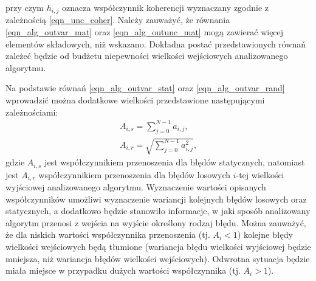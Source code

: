 przy czym $h_{i,j}$ oznacza współczynnik koherencji wyznaczany zgodnie z zależnością \eqref{eqn_unc_coher}. Należy zauważyć, że równania \eqref{eqn_alg_outvar_mat} oraz \eqref{eqn_alg_outunc_mat} mogą zawierać więcej elementów składowych, niż wskazano. Dokładna postać przedstawionych równań zależeć będzie od budżetu niepewności wielkości wejściowych analizowanego algorytmu.

Na podstawie równań \eqref{eqn_alg_outvar_stat} oraz \eqref{eqn_alg_outvar_rand} wprowadzić można dodatkowe wielkości przedstawione następującymi zależnościami:
\begin{gather}
A_{i,s} = \sum _{j = 0} ^{N-1} a_{i, j} \label{eqn_alg_trans_stat}, \\
A_{i,r} = \sqrt{\sum _{j = 0} ^{N-1} a_{i, j}^{2}} \label{eqn_alg_trans_rand},
\end{gather}
gdzie $A_{i,s}$ jest współczynnikiem przenoszenia dla błędów statycznych, natomiast jest $A_{i,r}$ współczynnikiem przenoszenia dla błędów losowych $i$-tej wielkości wyjściowej analizowanego algorytmu. Wyznaczenie wartości opisanych współczynników umożliwi wyznaczenie wariancji kolejnych błędów losowych oraz statycznych, a dodatkowo będzie stanowiło informacje, w jaki sposób analizowany algorytm przenosi z wejścia na wyjście określony rodzaj błędu. Można zauważyć, że dla niskich wartości współczynnika przenoszenia (tj. $A_{i} < 1$) kolejne błędy wielkości wejściowych będą tłumione (wariancja błędu wielkości wyjściowej będzie mniejsza, niż wariancja błędów wielkości wejściowych). Odwrotna sytuacja będzie miała miejsce w przypadku dużych wartości współczynnika (tj. $A_{i} > 1$).

